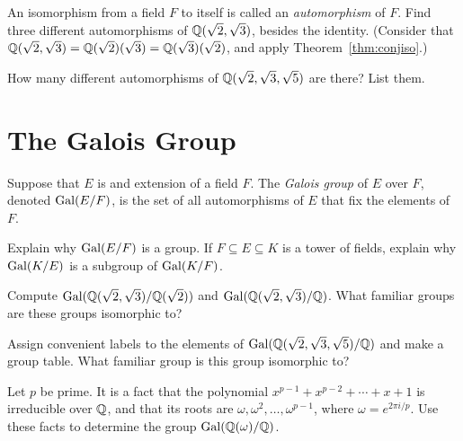 \begin{problem}
    An isomorphism from a field $F$ to itself is called an \textit{automorphism} of $F$. Find three different automorphisms of $\mathbb{Q}(\sqrt{2},\sqrt{3})$, besides the identity. (Consider that $\mathbb{Q}(\sqrt{2},\sqrt{3})=\mathbb{Q}(\sqrt{2})(\sqrt{3})=\mathbb{Q}(\sqrt{3})(\sqrt{2})$, and apply Theorem~\ref{thm:conjiso}.)
\end{problem}



\begin{problem}
    How many different automorphisms of $\mathbb{Q}(\sqrt{2},\sqrt{3},\sqrt{5})$ are there? List them.
\end{problem}

\section{The Galois Group}

\begin{definition}
    Suppose that $E$ is and extension of a field $F$. The \textit{Galois group} of $E$ over $F$, denoted $\operatorname{Gal}(E/F)$, is the set of all automorphisms of $E$ that fix the elements of $F$.
\end{definition}

\begin{problem}
    Explain why $\operatorname{Gal}(E/F)$ is a group. If $F\subseteq E\subseteq K$ is a tower of fields, explain why $\operatorname{Gal}(K/E)$ is a subgroup of $\operatorname{Gal}(K/F)$.
\end{problem}



\begin{problem}
    Compute $\operatorname{Gal}(\mathbb{Q}(\sqrt{2},\sqrt{3})/\mathbb{Q}(\sqrt{2}))$ and $\operatorname{Gal}(\mathbb{Q}(\sqrt{2},\sqrt{3})/\mathbb{Q})$. What familiar groups are these groups isomorphic to?
\end{problem}



\begin{problem}
    Assign convenient labels to the elements of $\operatorname{Gal}(\mathbb{Q}(\sqrt{2},\sqrt{3},\sqrt{5})/\mathbb{Q})$ and make a group table. What familiar group is this group isomorphic to?
\end{problem}



\begin{problem}
    Let $p$ be prime. It is a fact that the polynomial $x^{p-1}+x^{p-2}+\cdots+x+1$ is irreducible over $\mathbb{Q}$, and that its roots are $\omega,\omega^2,\ldots,\omega^{p-1}$, where $\omega = e^{2\pi i/p}$. Use these facts to determine the group $\operatorname{Gal}(\mathbb{Q}(\omega)/\mathbb{Q})$.
\end{problem}



